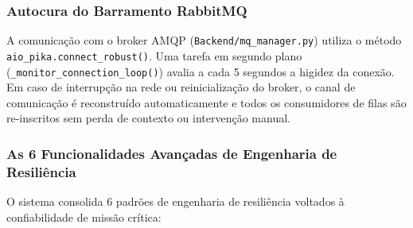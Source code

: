 \documentclass[12pt,a4paper]{article}
\begin{document}
\subsubsection{Autocura do Barramento RabbitMQ}
A comunicação com o broker AMQP (\texttt{Backend/mq\_manager.py}) utiliza o método \texttt{aio\_pika.connect\_robust()}. Uma tarefa em segundo plano (\texttt{\_monitor\_connection\_loop()}) avalia a cada 5 segundos a higidez da conexão. Em caso de interrupção na rede ou reinicialização do broker, o canal de comunicação é reconstruído automaticamente e todos os consumidores de filas são re-inscritos sem perda de contexto ou intervenção manual.

\subsubsection{As 6 Funcionalidades Avançadas de Engenharia de Resiliência}
O sistema consolida 6 padrões de engenharia de resiliência voltados à confiabilidade de missão crítica:
\end{document}
